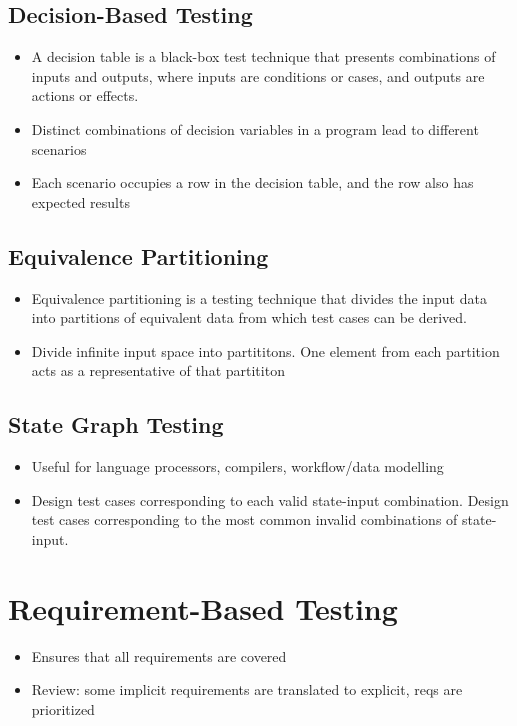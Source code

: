 \documentclass{article}
\begin{document}
\subsection{Decision-Based Testing}
\begin{itemize}

    \item A decision table is a black-box test technique that presents combinations of inputs and outputs, where inputs are conditions or cases, and outputs are actions or effects.

    \item Distinct combinations of decision variables in a program lead to  different scenarios
    
    \item Each scenario occupies a row in the decision table, and the  row also has expected results
\end{itemize}

\subsection{Equivalence Partitioning}
\begin{itemize}
    \item Equivalence partitioning is a testing technique that divides the input data into partitions of equivalent data from which test cases can be derived.
    
    \item Divide infinite input space into partititons. One element from each partition acts as a representative of that partititon

\end{itemize}

\subsection{State Graph Testing}
\begin{itemize}
    \item Useful for language processors, compilers, workflow/data modelling
    
    \item Design test cases corresponding to each valid state-input combination.
Design test cases corresponding to the most common invalid combinations  of state-input.
\end{itemize}

\section{Requirement-Based Testing}
\begin{itemize}
    \item Ensures that all requirements are covered
    
    \item Review: some implicit requirements are translated to explicit, reqs are prioritized
\end{itemize}
\end{document}
